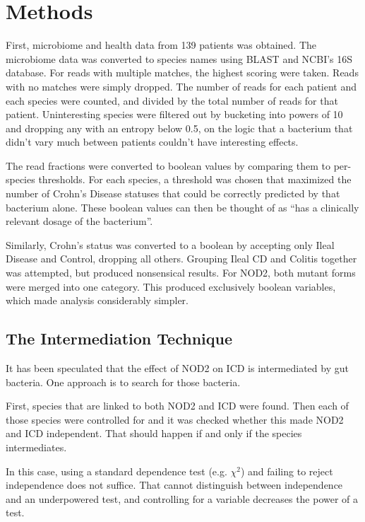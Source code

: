 \documentclass[a4paper]{article}
\begin{document}
\section{Methods}

First, microbiome and health data from 139 patients\cite{data} was
obtained. The microbiome data was
converted  to species names using BLAST and NCBI's
16S database.  For reads with multiple matches, the highest
scoring were taken.  Reads with no matches were simply dropped.  
The number of reads for each patient and each species were counted, and divided
by the total number of reads for that patient.  Uninteresting species
were filtered out
by bucketing into powers of 10 and dropping
any with an entropy below 0.5, on the logic that a bacterium that
didn't vary much between patients couldn't have interesting effects.

The read fractions were converted to boolean values by comparing them to
per-species thresholds.  For each species, a threshold was chosen that
maximized the number of Crohn's Disease statuses that could be
correctly predicted by that bacterium alone.  These boolean values can
then be thought of as ``has a clinically relevant dosage of the
bacterium''.

Similarly, Crohn's status was converted to a boolean by accepting only
Ileal Disease and Control, dropping all others.  Grouping
Ileal CD and Colitis together was attempted, but produced nonsensical results.  For
NOD2, both mutant forms were merged into one category.  This produced exclusively
boolean variables, which made analysis considerably simpler.

\subsection{The Intermediation Technique}

It has been speculated that the effect of NOD2 on ICD is
intermediated by gut bacteria.  One approach is to search for
those bacteria.

First, species that are linked to both NOD2 and ICD were found.
Then each of those species were controlled for and it was checked whether
this  made NOD2 and
ICD independent.  That should happen if and only if the species
intermediates.

In this case, using a standard dependence test (e.g. $\chi^2$) and
failing to reject independence does not suffice.  That cannot
distinguish between independence and an underpowered test, and
controlling for a variable decreases the power of a test.  
\end{document}
